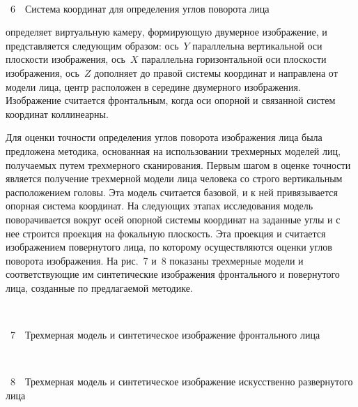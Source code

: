 \begin{multicols}{2}
\noindent 
\begin{center} %
\mbox{%
\epsfxsize=66.117mm
}
\end{center}
\vspace*{2pt}
{{\figurename~6}\ \ \small{Система координат для определения  углов поворота лица}}


\bigskip
\addtocounter{figure}{1}
\pagebreak


\noindent
определяет виртуальную камеру, формирующую двумерное изображение, и представляется следующим 
образом: ось~$Y$ параллельна вертикальной оси плоскости изображения, ось~$X$ параллельна горизонтальной оси плоскости 
изображения, ось~$Z$ дополняет до правой системы координат и на\-прав\-ле\-на от модели лица, центр расположен в середине 
двумерного изображения. Изображение считается фронтальным, когда оси опорной и связанной систем координат коллинеарны.


Для оценки точности определения углов поворота изображения лица была предложена методика, основанная на использовании 
трехмерных моделей лиц, получаемых путем трехмерного сканирования. Первым шагом в оценке точности является получение 
трехмерной модели лица человека со строго вертикальным расположением головы. Эта модель считается базовой, и к ней 
привязывается опорная система координат. На следующих этапах исследования модель поворачивается вокруг осей опорной 
системы координат на заданные углы и с нее строится проекция на фокальную плоскость. Эта проекция и считается 
изображением повернутого лица, по которому осуществляются оценки углов поворота изображения. На рис.~7 
и~8 показаны трехмерные модели и соответствующие им синтетические изображения фронтального и повернутого 
лица, созданные по предлагаемой методике.

\begin{center} %
\vspace*{12pt}
\mbox{%
\epsfxsize=79.88mm
}
\end{center}
\vspace*{2pt}
{{\figurename~7}\ \ \small{Трехмерная модель и синтетическое изображение фронтального лица}}


\bigskip
\addtocounter{figure}{1}

\begin{center} %
\vspace*{6pt}
\mbox{%
\epsfxsize=79.88mm
}
\end{center}
\vspace*{2pt}
{{\figurename~8}\ \ \small{Трехмерная модель и синтетическое изображение искусственно развернутого лица}}



\end{multicols}
